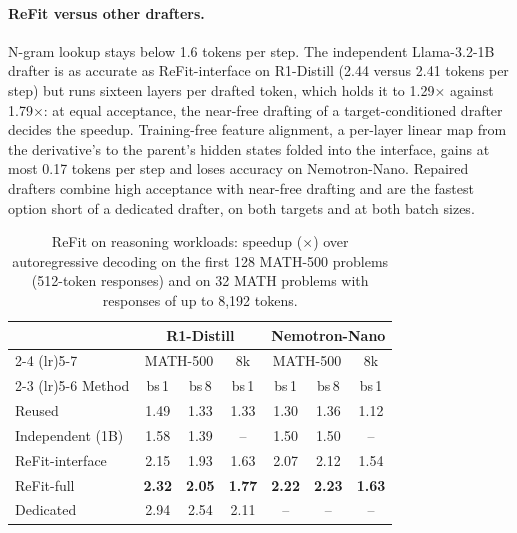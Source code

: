 \documentclass[11pt]{article}
\newcommand{\refit}{ReFit}
\newcommand{\refitI}{ReFit-interface}
\newcommand{\refitF}{ReFit-full}
\begin{document}
\paragraph{\refit{} versus other drafters.}
N-gram lookup stays below 1.6 tokens per step.
The independent Llama-3.2-1B drafter is as accurate as \refitI{} on R1-Distill (2.44 versus 2.41 tokens per step) but runs sixteen layers per drafted token, which holds it to 1.29$\times$ against 1.79$\times$: at equal acceptance, the near-free drafting of a target-conditioned drafter decides the speedup.
Training-free feature alignment, a per-layer linear map from the derivative's to the parent's hidden states folded into the interface, gains at most 0.17 tokens per step and loses accuracy on Nemotron-Nano.
Repaired drafters combine high acceptance with near-free drafting and are the fastest option short of a dedicated drafter, on both targets and at both batch sizes.

\begin{table}[t]
  \centering
  \small
  \setlength{\tabcolsep}{3.1pt}
  \begin{tabular}{@{}lcccccc@{}}
    \toprule
    & \multicolumn{3}{c}{R1-Distill} & \multicolumn{3}{c}{Nemotron-Nano} \\
    \cmidrule(lr){2-4} \cmidrule(lr){5-7}
    & \multicolumn{2}{c}{MATH-500} & 8k & \multicolumn{2}{c}{MATH-500} & 8k \\
    \cmidrule(lr){2-3} \cmidrule(lr){5-6}
    Method & bs\,1 & bs\,8 & bs\,1 & bs\,1 & bs\,8 & bs\,1 \\
    \midrule
    Reused & 1.49 & 1.33 & 1.33 & 1.30 & 1.36 & 1.12 \\
    Independent (1B) & 1.58 & 1.39 & -- & 1.50 & 1.50 & -- \\
    \refitI{} & 2.15 & 1.93 & 1.63 & 2.07 & 2.12 & 1.54 \\
    \refitF{} & \textbf{2.32} & \textbf{2.05} & \textbf{1.77} & \textbf{2.22} & \textbf{2.23} & \textbf{1.63} \\
    \midrule
    \textcolor{black!60}{Dedicated} & \textcolor{black!60}{2.94} & \textcolor{black!60}{2.54} & \textcolor{black!60}{2.11} & -- & -- & -- \\
    \bottomrule
  \end{tabular}
  \caption{\refit{} on reasoning workloads: speedup ($\times$) over autoregressive decoding on the first 128 MATH-500 problems (512-token responses) and on 32 MATH problems with responses of up to 8,192 tokens.}
  \label{tab:reasoning}
\end{table}
\end{document}
